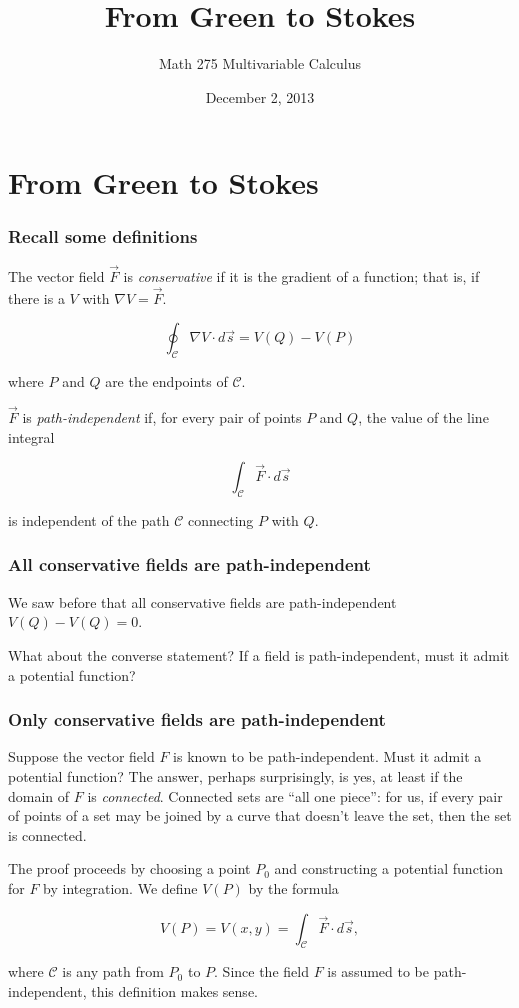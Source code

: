 \documentclass[11pt,ignorenonframetext,aspectratio=169,xcolor={svgnames}]{beamer}
\title{From Green to Stokes}
\author{Math 275 Multivariable Calculus}
\date{December 2, 2013}
\begin{document}
\frame{\titlepage}

\section{From Green to Stokes}

\begin{frame}\frametitle{Recall some definitions}

The vector field $\vec{F}$ is \emph{conservative} if it is the gradient
of a function; that is, if there is a $V$ with $\nabla V = \vec{F}$.

\begin{equation*}
    \oint_{\mathcal{C}} \nabla V \cdot d\vec{s} = V(Q) - V(P)
\end{equation*}

where $P$ and $Q$ are the endpoints of $\mathcal{C}$.

$\vec{F}$ is \emph{path-independent} if, for every pair of points $P$
and $Q$, the value of the line integral

\begin{equation*}
    \int_{\mathcal{C}} \vec{F} \cdot d\vec{s}
\end{equation*}

is independent of the path $\mathcal{C}$ connecting $P$ with $Q$.

\end{frame}

\begin{frame}\frametitle{All conservative fields are path-independent}

We saw before that all conservative fields are path-independent
$V(Q) - V(Q) = 0$.

What about the converse statement? If a field is path-independent, must
it admit a potential function?

\end{frame}

\begin{frame}\frametitle{Only conservative fields are path-independent}

Suppose the vector field $F$ is known to be path-independent. Must it
admit a potential function? The answer, perhaps surprisingly, is yes, at
least if the domain of $F$ is \emph{connected}. Connected sets are ``all
one piece'': for us, if every pair of points of a set may be joined by a
curve that doesn't leave the set, then the set is connected.

The proof proceeds by choosing a point $P_0$ and constructing a
potential function for $F$ by integration. We define $V(P)$ by the
formula

\[ V(P) = V(x,y) = \int_{\mathcal{C}} \vec{F} \cdot d\vec{s}, \]

where $\mathcal{C}$ is any path from $P_0$ to $P$. Since the field $F$
is assumed to be path-independent, this definition makes sense.

\end{frame}
\end{document}
